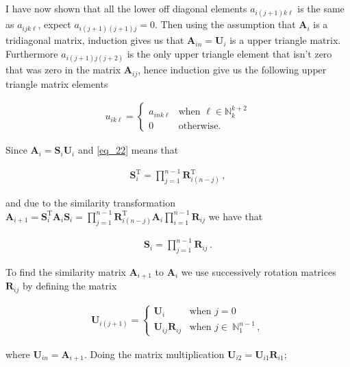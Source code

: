 \documentclass[11pt,english,a4paper]{article}
\begin{document}
\begin{flushleft}
I have now shown that all the lower off diagonal elements $a_{i(j+1)k\ell}$ is the same as $a_{ijk\ell}$, expect $a_{i(j+1)(j+1)j}=0$. Then using the assumption that $\textbf{A}_i$ is a tridiagonal matrix, induction gives us that $\textbf{A}_{in} = \textbf{U}_i$ is a upper triangle matrix. Furthermore $a_{i(j+1)j(j+2)}$ is the only upper triangle element that isn't zero that was zero in the matrix $\textbf{A}_{ij}$, hence induction give us the following upper triangle matrix elements

\begin{align}
u_{ik\ell} = \begin{cases} a_{ink\ell} & \text{when } \ell\in\mathbb{N}_k^{k+2} \\ 0 & \text{otherwise.} \end{cases}
\label{eq_24}
\end{align}

Since $\textbf{A}_i = \textbf{S}_i \textbf{U}_i$ and \eqref{eq_22} means that 

\begin{align*}
\textbf{S}_i^{\text{T}} = \prod_{j=1}^{n-1} \textbf{R}_{i(n-j)}^{\text{T}} \,,
\end{align*}

and due to the similarity transformation $\textbf{A}_{i+1} = \textbf{S}_i^{\text{T}} \textbf{A}_i \textbf{S}_i = \prod_{j=1}^{n-1}\textbf{R}_{i(n-j)}^{\text{T}} \textbf{A}_i \prod_{i=1}^{n-1}\textbf{R}_{ij}$ we have that

\begin{align*}
\textbf{S}_i = \prod_{j=1}^{n-1} \textbf{R}_{ij} \,.
\end{align*}

To find the similarity matrix $\textbf{A}_{i+1}$ to $\textbf{A}_i$ we use successively rotation matrices $\textbf{R}_{ij}$ by defining the matrix

\begin{align*}
\textbf{U}_{i(j+1)} = \begin{cases} \textbf{U}_i & \text{when } j = 0 \\ \textbf{U}_{ij}\textbf{R}_{ij} & \text{when } j\in \ \mathbb{N}_1^{n-1}\,, \end{cases}
\end{align*}

where $\textbf{U}_{in} = \textbf{A}_{i+1}$. Doing the matrix multiplication $\textbf{U}_{i2} = \textbf{U}_{i1} \textbf{R}_{i1}$;


\end{flushleft}
\end{document}
